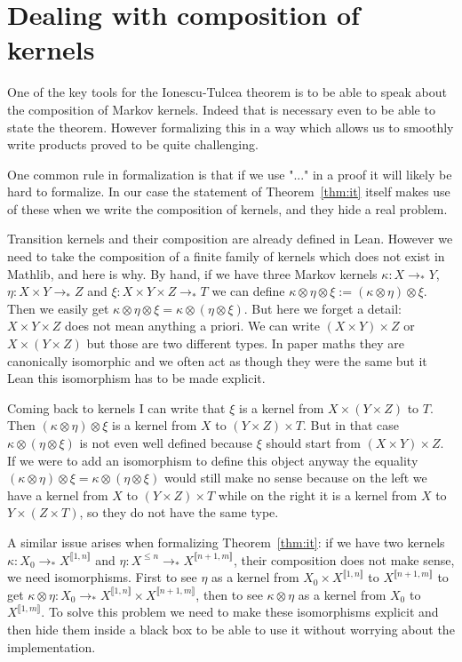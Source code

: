 \documentclass{article}
\newcommand{\Xlen}{X^{\le n}}
\newcommand{\dbrack}[1]{\llbracket #1 \rrbracket}
\newcommand{\ox}{\otimes}
\newcommand{\Xint}[1]{X^{\dbrack{#1}}}
\newcommand{\tost}{\to_*}
\theoremstyle{definition}
\theoremstyle{remark}
\begin{document}
	\section{Dealing with composition of kernels}

	One of the key tools for the Ionescu-Tulcea theorem is to be able to speak about the composition of Markov kernels. Indeed that is necessary even to be able to state the theorem. However formalizing this in a way which allows us to smoothly write products proved to be quite challenging.

	One common rule in formalization is that if we use "..." in a proof it will likely be hard to formalize. In our case the statement of Theorem~\ref{thm:it} itself makes use of these when we write the composition of kernels, and they hide a real problem.

	Transition kernels and their composition are already defined in Lean. However we need to take the composition of a finite family of kernels which does not exist in Mathlib, and here is why. By hand, if we have three Markov kernels $\kappa : X \tost Y$, $\eta : X \times Y \tost Z$ and $\xi : X \times Y \times Z \tost T$ we can define $\kappa \ox \eta \ox \xi := (\kappa \ox \eta) \ox \xi$. Then we easily get $\kappa \ox \eta \ox \xi = \kappa \ox (\eta \ox \xi)$. But here we forget a detail: $X \times Y \times Z$ does not mean anything a priori. We can write $(X \times Y) \times Z$ or $X \times (Y \times Z)$ but those are two different types. In paper maths they are canonically isomorphic and we often act as though they were the same but it Lean this isomorphism has to be made explicit.

	Coming back to kernels I can write that $\xi$ is a kernel from $X \times (Y \times Z)$ to $T$. Then $(\kappa \ox \eta) \ox \xi$ is a kernel from $X$ to $(Y \times Z) \times T$. But in that case $\kappa \ox (\eta \ox \xi)$ is not even well defined because $\xi$ should start from $(X \times Y) \times Z$. If we were to add an isomorphism to define this object anyway the equality $(\kappa \ox \eta) \ox \xi = \kappa \ox (\eta \ox \xi)$ would still make no sense because on the left we have a kernel from $X$ to $(Y \times Z) \times T$ while on the right it is a kernel from $X$ to $Y \times (Z \times T)$, so they do not have the same type.

	A similar issue arises when formalizing Theorem~\ref{thm:it}: if we have two kernels $\kappa : X_0 \tost \Xint{1,n}$ and $\eta : \Xlen \tost \Xint{n+1,m}$, their composition does not make sense, we need isomorphisms. First to see $\eta$ as a kernel from $X_0 \times \Xint{1,n}$ to $\Xint{n+1,m}$ to get $\kappa \ox \eta : X_0 \tost \Xint{1,n} \times \Xint{n+1,m}$, then to see $\kappa \ox \eta$ as a kernel from $X_0$ to $\Xint{1,m}$. To solve this problem we need to make these isomorphisms explicit and then hide them inside a black box to be able to use it without worrying about the implementation.
\end{document}
